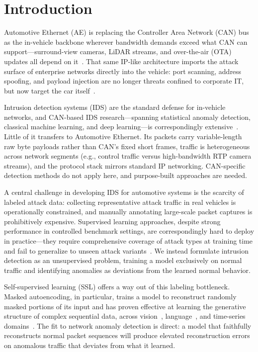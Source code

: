 \section{Introduction}
Automotive Ethernet (AE) is replacing the Controller Area Network (CAN) bus as the in-vehicle backbone wherever bandwidth demands exceed what CAN can support---surround-view cameras, LiDAR streams, and over-the-air (OTA) updates all depend on it~\cite{matheus2021automotive}. That same IP-like architecture imports the attack surface of enterprise networks directly into the vehicle: port scanning, address spoofing, and payload injection are no longer threats confined to corporate IT, but now target the car itself~\cite{douss2023state}.

Intrusion detection systems (IDS) are the standard defense for in-vehicle networks, and CAN-based IDS research---spanning statistical anomaly detection, classical machine learning, and deep learning---is correspondingly extensive~\cite{lokman2019intrusion}. Little of it transfers to Automotive Ethernet. Its packets carry variable-length raw byte payloads rather than CAN's fixed short frames, traffic is heterogeneous across network segments (e.g., control traffic versus high-bandwidth RTP camera streams), and the protocol stack mirrors standard IP networking. CAN-specific detection methods do not apply here, and purpose-built approaches are needed.

A central challenge in developing IDS for automotive systems is the scarcity of labeled attack data: collecting representative attack traffic in real vehicles is operationally constrained, and manually annotating large-scale packet captures is prohibitively expensive. Supervised learning approaches, despite strong performance in controlled benchmark settings, are correspondingly hard to deploy in practice---they require comprehensive coverage of attack types at training time and fail to generalize to unseen attack variants~\cite{hindy2020taxonomy}. We instead formulate intrusion detection as an unsupervised problem, training a model exclusively on normal traffic and identifying anomalies as deviations from the learned normal behavior.

Self-supervised learning (SSL) offers a way out of this labeling bottleneck. Masked autoencoding, in particular, trains a model to reconstruct randomly masked portions of its input and has proven effective at learning the generative structure of complex sequential data, across vision~\cite{he2022masked}, language~\cite{devlin2019bert}, and time-series domains~\cite{yue2022ts2vec}. The fit to network anomaly detection is direct: a model that faithfully reconstructs normal packet sequences will produce elevated reconstruction errors on anomalous traffic that deviates from what it learned.

